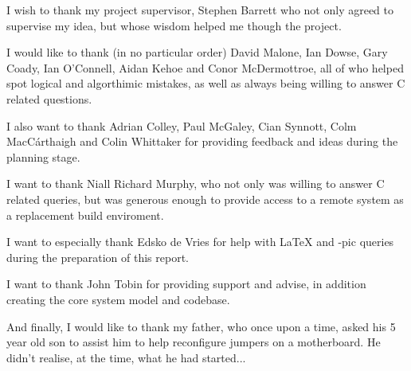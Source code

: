 
I wish to thank my project supervisor, Stephen Barrett who not only
agreed to supervise my idea, but whose wisdom helped me though the
project.


I would like to thank (in no particular order) David Malone, 
Ian Dowse, Gary Coady, Ian O'Connell, Aidan Kehoe and 
Conor McDermottroe, all of who helped spot logical and algorthimic 
mistakes, as well as always being willing to answer C related 
questions.


I also want to thank Adrian Colley, Paul McGaley, Cian Synnott, Colm
MacC\'{a}rthaigh and Colin Whittaker for providing feedback and ideas 
during the planning stage.


I want to thank Niall Richard Murphy, who not only was willing to answer
C related queries, but was generous enough to provide access to a remote
system as a replacement build enviroment.


I want to especially thank Edsko de Vries for help with \LaTeX \space 
and \Xy-pic queries during the preparation of this report.


I want to thank John Tobin for providing support and advise, in 
addition creating the core system model and codebase.


And finally, I would like to thank my father, who once upon a time, 
asked his 5 year old son to assist him to help reconfigure jumpers on
a motherboard. He didn't realise, at the time, what he had started...
